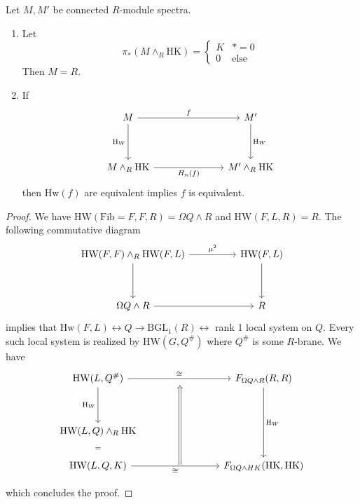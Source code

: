 \begin{proposition}
\text{ }
Let $M, M'$ be connected $R$-module spectra.
\begin{enumerate}
\item Let
    \[\pi_*(M\wedge_R \text{HK}) = \begin{cases} K & *=0 \\ 0 & \text{else} \end{cases}
    \]
    Then $M=R$.
\item If
\[\begin{tikzcd}
	M &&& {M'} \\
	\\
	{M\wedge_R \text{HK}} &&& {M'\wedge_R \text{HK}}
	\arrow["f", from=1-1, to=1-4]
	\arrow["{\text{H}_W}"', from=1-1, to=3-1]
	\arrow["{\text{H}_W}", from=1-4, to=3-4]
	\arrow["{H_n(f)}"', from=3-1, to=3-4]
\end{tikzcd}\]
    then $\text{Hw}(f)$ are equivalent implies $f$ is equivalent.
\end{enumerate}

\end{proposition}

\begin{proof}
\text{ }
We have $\text{HW}(\text{Fib}=F, F, R)=\Omega Q \wedge R$ and $\text{HW}(F,L, R) =R$. The following commutative diagram 
    \[\begin{tikzcd}
        {\text{HW}(F, F)\wedge_R \text{HW}(F, L)} && {\text{HW}(F,L)} \\
        \\
        {\Omega Q \wedge R} && R
        \arrow["{\mu^2}", from=1-1, to=1-3]
        \arrow[from=1-1, to=3-1]
        \arrow[from=1-3, to=3-3]
        \arrow[from=3-1, to=3-3]
    \end{tikzcd}\]
implies that $\text{Hw}(F,L) \leftrightarrow Q \to \text{BGL}_1(R) \leftrightarrow $ rank 1 local system on $Q$. Every such local system is realized by $\text{HW}(G, Q^\#)$ where $Q^{\#}$ is some $R$-brane. We have
\[\begin{tikzcd}
	{\text{HW}(L, Q^\#)} & {} && {F_{\Omega Q \wedge R}(R, R)} \\
	\\
	{\text{HW}(L, Q)\wedge_R \text{HK}} \\
	{\text{HW}(L,Q,K)} & {} && {F_{\Omega Q \wedge HK}(\text{HK}, \text{HK})}
	\arrow["\cong", from=1-1, to=1-4]
	\arrow["{{{\text{H}_W}}}"', from=1-1, to=3-1]
	\arrow["{{{\text{H}_W}}}", from=1-4, to=4-4]
	\arrow["{{{=}}}"{description}, draw=none, from=3-1, to=4-1]
	\arrow["\cong"', from=4-1, to=4-4]
	\arrow[shift right=5, Rightarrow, from=4-2, to=1-2]
\end{tikzcd}\]

which concludes the proof.
\end{proof}

